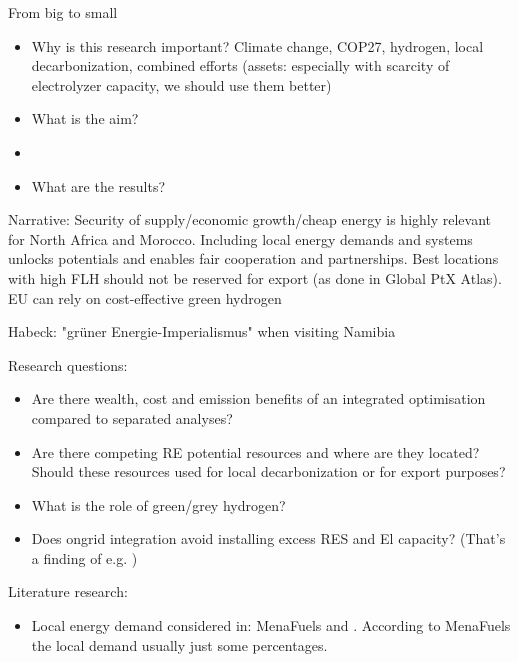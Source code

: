 From big to small
\begin{itemize}
    \item Why is this research important? Climate change, COP27, hydrogen, local decarbonization, combined efforts (assets: especially with scarcity of electrolyzer capacity, we should use them better)
    \item What is the aim?
    \item 
    \item What are the results?
\end{itemize}
Narrative: 
Security of supply/economic growth/cheap energy is highly relevant for North Africa and Morocco. 
Including local energy demands and systems unlocks potentials and enables fair cooperation and partnerships.
Best locations with high FLH should not be reserved for export (as done in Global PtX Atlas). 
EU can rely on cost-effective green hydrogen

Habeck: "gr{\"u}ner Energie-Imperialismus" when visiting Namibia \cite{HabeckEnergieimperialismus}

Research questions:
\begin{itemize}
    \item Are there wealth, cost and emission benefits of an integrated optimisation compared to separated analyses?
    \item Are there competing RE potential resources and where are they located? Should these resources used for local decarbonization or for export purposes?
    \item What is the role of green/grey hydrogen?   
    \item Does ongrid integration avoid installing excess RES and El capacity? (That's a finding of e.g. \cite{Ruhnau2022})
\end{itemize}

Literature research:
\begin{itemize}
    \item Local energy demand considered in: MenaFuels and \cite{Hampp2021}. According to MenaFuels the local demand usually just some percentages.
\end{itemize}